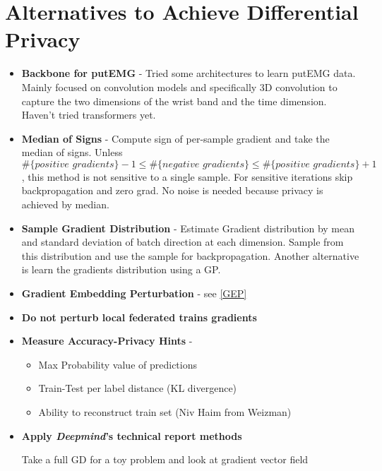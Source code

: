 \section{Alternatives to Achieve Differential Privacy}
\begin{itemize}

    \item \textbf{Backbone for putEMG} - Tried some architectures to learn putEMG data. Mainly focused on convolution models and specifically 3D convolution to capture the two dimensions of the wrist band and the time dimension. Haven't tried transformers yet.

    \item \textbf{Median of Signs} -  Compute sign of per-sample gradient and take the median of signs. Unless \\ $\#\{ \textit{positive gradients}\} - 1 \leq \#\{\textit{negative gradients}\} \leq \#\{\textit{positive gradients}\} + 1 $, this method is not sensitive to a single sample. For sensitive iterations skip backpropagation and zero grad. No noise is needed because privacy is achieved by median.

    \item \textbf{Sample Gradient Distribution} - Estimate Gradient distribution by mean and standard deviation of batch direction at each dimension. Sample from this distribution and use the sample for backpropagation. Another alternative is learn the gradients distribution using a GP.

    \item \textbf{Gradient Embedding Perturbation} - see \ref{GEP}

    \item \textbf{Do not perturb local federated trains gradients}

    \item  \textbf{Measure Accuracy-Privacy Hints} - 
    \begin{itemize}
        \item Max Probability value of predictions
        \item Train-Test per label distance (KL divergence)
        \item Ability to reconstruct train set (Niv Haim from Weizman)
    \end{itemize}  

    \item \textbf{Apply \textit{Deepmind}'s technical report \cite{DeUnlockingScale} methods}
    

     Take a full GD for a toy problem and look at gradient vector field
    
\end{itemize}